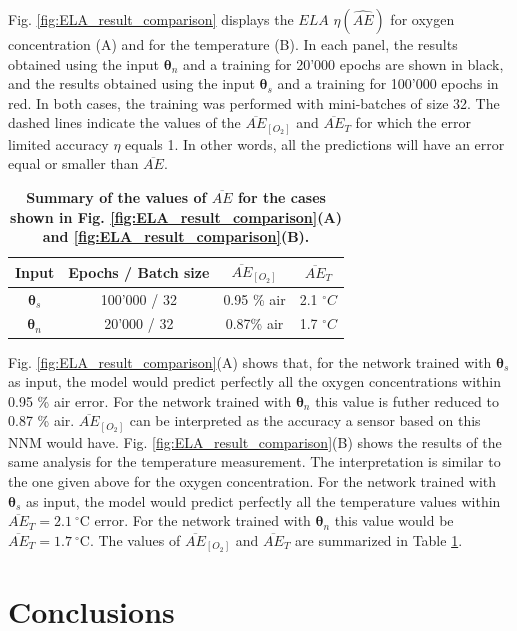 \documentclass[sensors,article,submit,moreauthors,pdftex,10pt,a4paper]{Definitions/mdpi}
\begin{document}
Fig. \ref{fig:ELA_result_comparison} displays the $ELA$ $\eta(\widehat {AE})$ for oxygen concentration (A) and for the temperature (B). In each panel, the results obtained using the input ${\pmb \theta}_n$ and a training for 20'000 epochs are shown in black, and the results obtained using the input ${\pmb \theta}_s$ and a training for 100'000 epochs in red. In both cases, the training was performed with mini-batches of size 32.
The dashed lines indicate the values of the $\overline{AE}_{[O_2]}$ and $\overline{AE}_{T}$ for which the error limited accuracy $\eta$ equals 1. In other words, all the predictions will have an error equal or smaller than $\overline{AE}$.

\begin{table}[htb]
\centering
\caption {\bf Summary of the values of $\overline{AE}$ for the cases shown in Fig. \ref{fig:ELA_result_comparison}(A) and \ref{fig:ELA_result_comparison}(B).}
\begin{tabular}{ cccc}
\smallskip 
 Input & Epochs / Batch size & $\overline{AE}_{[O_2]}$ & $\overline{AE}_{T}$  \\ 
 \hline
${\pmb \theta}_s$ & 100'000 / 32 & 0.95 \% air & 2.1 $^\circ C$\\ 
${\pmb \theta}_n $ & 20'000 / 32 & 0.87\% air & 1.7 $^\circ C$\\ 
\end{tabular}
\label{table:ela}
\end{table}

Fig. \ref{fig:ELA_result_comparison}(A) shows that, for the network trained with ${\pmb \theta}_s$ as input, the model would predict perfectly all the oxygen concentrations within 0.95 \% air error. For the network trained with ${\pmb \theta}_n$ this value is futher reduced to 0.87 \% air. $\overline{AE}_{[O_2]}$ can be interpreted as the accuracy a sensor based on this NNM  would have.
Fig. \ref{fig:ELA_result_comparison}(B) shows the results of the same analysis for the temperature measurement. The interpretation is similar to the one given above for the oxygen concentration. For the network trained with ${\pmb \theta}_s$ as input, the model would predict perfectly all the temperature values within $\overline{AE}_{T}=2.1 \ ^\circ$C error. For the network trained with ${\pmb \theta}_n$ this value would be  $\overline{AE}_{T}=1.7 \ ^\circ$C. The values of $\overline{AE}_{[O_2]}$ and $\overline{AE}_{T}$ are summarized in Table \ref{table:ela}.



\section{Conclusions}
\end{document}
